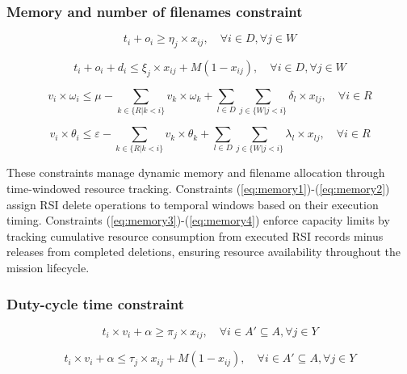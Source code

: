 \documentclass[preprint,3p,12pt,authoryear]{elsarticle}
\begin{document}
\subsubsection{Memory and number of filenames constraint}
\begin{equation}
t_i+o_i \ge \eta_j \times x_{ij}, \quad \forall i \in D, \forall j \in W \label{eq:memory1}
\end{equation}

\begin{equation}
t_i+o_i+d_i \le \xi_j \times x_{ij} + M(1-x_{ij}), \quad \forall i \in D, \forall j \in W \label{eq:memory2}
\end{equation}

\begin{equation}
v_i \times \omega_i \le \mu - \sum_{k \in \{R|k<i\}} v_k \times \omega_k + \sum_{l \in D} \sum_{j \in \{W|j<i\}} \delta_l \times x_{lj}, \quad \forall i \in R \label{eq:memory3}
\end{equation}

\begin{equation}
v_i \times \theta_i \le \varepsilon - \sum_{k \in \{R|k<i\}} v_k \times \theta_k + \sum_{l \in D} \sum_{j \in \{W|j<i\}} \lambda_l \times x_{lj}, \quad \forall i \in R \label{eq:memory4}
\end{equation}

These constraints manage dynamic memory and filename allocation through time-windowed resource tracking. Constraints (\ref{eq:memory1})-(\ref{eq:memory2}) assign RSI delete operations to temporal windows based on their execution timing. Constraints (\ref{eq:memory3})-(\ref{eq:memory4}) enforce capacity limits by tracking cumulative resource consumption from executed RSI records minus releases from completed deletions, ensuring resource availability throughout the mission lifecycle.

\subsubsection{Duty-cycle time constraint}
\begin{equation}
t_i \times v_i + \alpha \ge \pi_j \times x_{ij}, \quad \forall i \in A' \subseteq A, \forall j \in Y \label{eq:duty1}
\end{equation}

\begin{equation}
t_i \times v_i + \alpha \le \tau_j \times x_{ij} + M(1-x_{ij}), \quad \forall i \in A' \subseteq A, \forall j \in Y \label{eq:duty2}
\end{equation}
\end{document}
